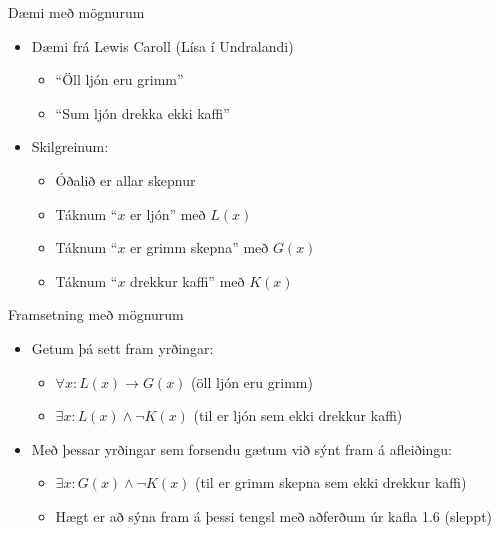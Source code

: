 \documentclass[handout]{beamer}
\begin{document}
\begin{frame}{Dæmi með mögnurum}
\begin{itemize}
 \item Dæmi frá Lewis Caroll (Lísa í Undralandi)
 \begin{itemize}
  \item ``Öll ljón eru grimm''
  \item ``Sum ljón drekka ekki kaffi''
 \end{itemize}
 \item Skilgreinum:
 \begin{itemize}
  \item Óðalið er allar skepnur
  \item Táknum ``$x$ er ljón'' með $L(x)$
  \item Táknum ``$x$ er grimm skepna'' með $G(x)$
  \item Táknum ``$x$ drekkur kaffi'' með $K(x)$
 \end{itemize}
\end{itemize}
\end{frame}

\begin{frame}{Framsetning með mögnurum}
\begin{itemize}
 \item Getum þá sett fram yrðingar:
 \begin{itemize}
  \item $\forall x: L(x) \to G(x)$ (öll ljón eru grimm)
  \item $\exists x: L(x) \land \lnot K(x)$ (til er ljón sem ekki drekkur kaffi)
 \end{itemize}
 \item Með þessar yrðingar sem forsendu gætum við sýnt fram á afleiðingu:
 \begin{itemize}
  \item $\exists x: G(x) \land \lnot K(x)$ (til er grimm skepna sem ekki drekkur kaffi)
  \item Hægt er að sýna fram á þessi tengsl með aðferðum úr kafla 1.6 (sleppt)
 \end{itemize}
\end{itemize}
\end{frame}
\end{document}
